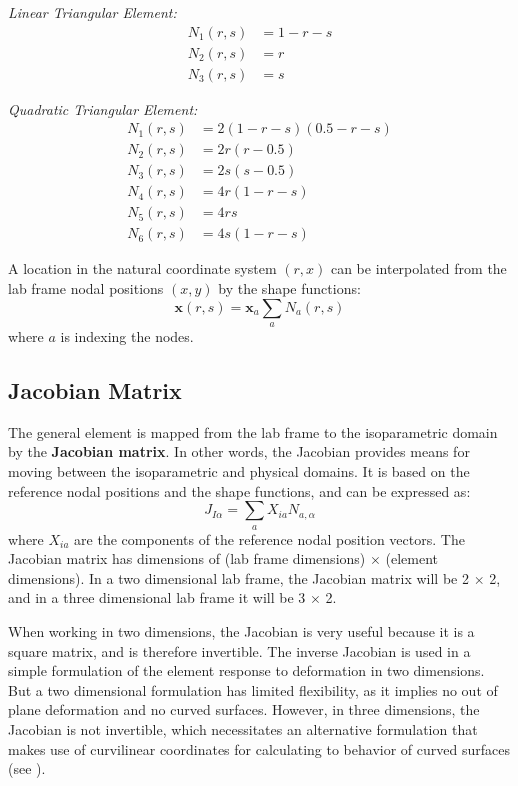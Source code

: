 \documentclass[]{spie}  %
\begin{document}
\textit{Linear Triangular Element:}
\begin{align}
\label{eq: linear element}
N_1(r,s) &=  1 - r - s \nonumber \\
N_2(r,s) &= r \nonumber \\
N_3(r,s) &= s
\end{align}

\textit{Quadratic Triangular Element:}
\begin{align}
\label{eq: linear element}
N_1(r,s) &= 2(1-r-s)(0.5-r-s) \nonumber \\
N_2(r,s) &= 2r(r-0.5) \nonumber \\
N_3(r,s) &= 2s(s-0.5) \nonumber \\
N_4(r,s) &= 4r(1-r-s) \nonumber \\
N_5(r,s) &= 4rs \nonumber \\
N_6(r,s) &= 4s(1-r-s) 
\end{align}

A location in the natural coordinate system $(r,x)$ can be interpolated from the lab frame nodal positions $(x,y)$ by the shape functions:
\begin{equation}
\label{eq: shape function mapping}
\bm{x}(r,s) = \bm{x}_a \sum\limits_{a} N_a(r,s) 
\end{equation}
where $a$ is indexing the nodes. 

\subsection{Jacobian Matrix}
The general element is mapped from the lab frame to the isoparametric domain by the \textbf{Jacobian matrix}. In other words, the Jacobian provides means for moving between the isoparametric and physical domains. It is based on the reference nodal positions and the shape functions, and can be expressed as:
\begin{equation}
\label{eq: Jacobian matrix}
J_{I\alpha} = \sum\limits_{a} X_{ia} N_{a,\alpha}
\end{equation}
where $X_{ia}$ are the components of the reference nodal position vectors. The Jacobian matrix has dimensions of (lab frame dimensions) $\times$ (element dimensions). In a two dimensional lab frame, the Jacobian matrix will be 2 $\times$ 2, and in a three dimensional lab frame it will be 3 $\times$ 2. 

When working in two dimensions, the Jacobian is very useful because it is a square matrix, and is therefore invertible. The inverse Jacobian is used in a simple formulation of the element response to deformation in two dimensions. But a two dimensional formulation has limited flexibility, as it implies no out of plane deformation and no curved surfaces. However, in three dimensions, the Jacobian is not invertible, which necessitates an alternative formulation that makes use of curvilinear coordinates for calculating to behavior of curved surfaces (see \textit{}).
\end{document}
